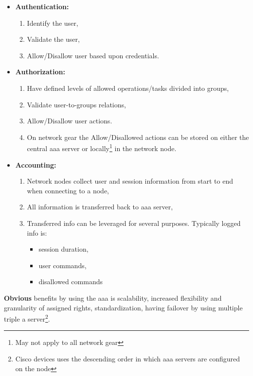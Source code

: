 \begin{itemize}
	\item \textbf{Authentication:}
	\begin{enumerate}
		\item Identify the user,
		\item Validate the user,
		\item Allow/Disallow user based upon credentials.
	\end{enumerate}
	\item \textbf{Authorization:}
	\begin{enumerate}
		\item Have defined levels of allowed operations/tasks divided into groups,
		\item Validate user-to-groups relations,
		\item Allow/Disallow user actions.
		\item On network gear the Allow/Disallowed actions can be stored on either the central \gls{aaa} server or locally\footnote{May not apply to all network gear} in the network node.
	\end{enumerate}
	\item \textbf{Accounting:}
	\begin{enumerate}
		\item Network nodes collect user and session information from start to end when connecting to a node,
		\item All information is transferred back to \gls{aaa} server,
		\item Transferred info can be leveraged for several purposes. Typically logged info is:
		\begin{itemize}
			\item session duration,
			\item user commands,
			\item disallowed commands
		\end{itemize}
	\end{enumerate}
\end{itemize}

\bigskip

\textbf{Obvious} benefits by using the \gls{aaa} is scalability, increased flexibility and granularity of assigned rights, standardization, having failover by using multiple triple a server\footnote{Cisco devices uses the descending order in which \gls{aaa} servers are configured on the node}.

\newpage

